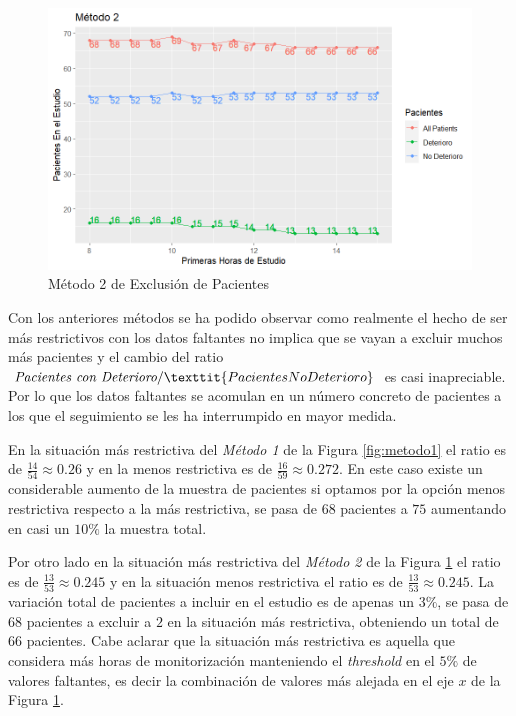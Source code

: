 \begin{figure}[H]
    \centering
    \includegraphics[scale = 1]{./img/metodo2.png}
    \caption{Método 2 de Exclusión de Pacientes}
    \label{fig:metodo2}
\end{figure}

Con los anteriores métodos se ha podido observar como realmente el hecho de ser más restrictivos con los datos faltantes no implica que se vayan a excluir muchos más pacientes y el cambio del ratio $ \textit{Pacientes con Deterioro} / \texttit{Pacientes No Deterioro}$ es casi inapreciable. Por lo que los datos faltantes se acomulan en un número concreto de pacientes a los que el seguimiento se les ha interrumpido en mayor medida.

En la situación más restrictiva del \textit{Método 1} de la Figura \ref{fig:metodo1} el ratio es de $ \frac{14}{54} \approx 0.26$ y en la menos restrictiva es de $ \frac{16}{59} \approx 0.272$. En este caso existe un considerable aumento de la muestra de pacientes si optamos por la opción menos restrictiva respecto a la más restrictiva, se pasa de $68$ pacientes a $75$ aumentando en casi un $10 \%$ la muestra total. 

Por otro lado en la situación más restrictiva del \textit{Método 2} de la Figura \ref{fig:metodo2} el ratio es de $ \frac{13}{53} \approx 0.245$ y en la situación menos restrictiva el ratio es de $ \frac{13}{53} \approx 0.245$. La variación total de pacientes a incluir en el estudio es de apenas un $3 \%$, se pasa de $68$ pacientes a excluir a $2$ en la situación más restrictiva, obteniendo un total de $66$ pacientes. Cabe aclarar que la situación más restrictiva es aquella que considera más horas de monitorización manteniendo el \textit{threshold} en el $5 \%$ de valores faltantes, es decir la combinación de valores más alejada en el eje $x$ de la Figura \ref{fig:metodo2}.

